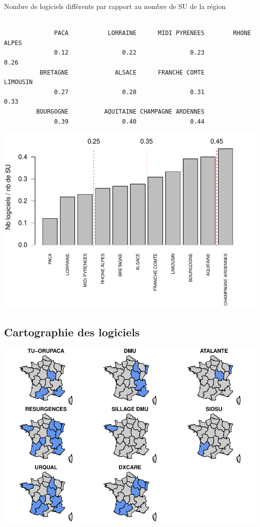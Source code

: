 \documentclass[]{article}
\begin{document}
Nombre de logiciels différents par rapport au nombre de SU de la région

\begin{verbatim}

              PACA           LORRAINE      MIDI PYRENEES        RHONE ALPES 
              0.12               0.22               0.23               0.26 
          BRETAGNE             ALSACE      FRANCHE COMTE           LIMOUSIN 
              0.27               0.28               0.31               0.33 
         BOURGOGNE          AQUITAINE CHAMPAGNE ARDENNES 
              0.39               0.40               0.44 
\end{verbatim}

\includegraphics{septembre2015_files/figure-latex/unnamed-chunk-12-1.pdf}

\subsection{Cartographie des
logiciels}\label{cartographie-des-logiciels}

\includegraphics{septembre2015_files/figure-latex/unnamed-chunk-13-1.pdf}
\end{document}
